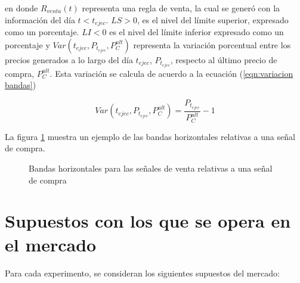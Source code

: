 \documentclass[12pt]{report}
\theoremstyle{break}
\theoremstyle{break}
\begin{document}
en donde $R_{venta}(t)$ representa una regla de venta, la cual se generó con la información del día $t < t_{ejec}$. $LS>0$, es el nivel del límite superior, expresado como un porcentaje. $LI<0$ es el nivel del límite inferior expresado como un porcentaje y $Var(t_{ejec}, P_{t_{ejec}}, P_{C}^{ult} )$ representa la variación porcentual entre los precios generados a lo largo del día $t_{ejec}$, $P_{t_{ejec}}$, respecto al último precio de compra, $P_{C}^{ult}$. Esta variación se calcula de acuerdo a la ecuación (\ref{eqn:variacion bandas})

\begin{equation} \label{eqn:variacion bandas}
Var(t_{ejec}, P_{t_{ejec}}, P_{C}^{ult} ) = \dfrac{P_{t_{ejec}}} {P_{C}^{ult}} - 1
\end{equation}

La figura \ref{imagen:bandas horizontales} muestra un ejemplo de las bandas horizontales relativas a una señal de compra.

\begin{figure}[htbp]
\centering
{}
\caption{\label{imagen:bandas horizontales}Bandas horizontales para las señales de venta relativas a una señal de compra}
\end{figure}

\section{Supuestos con los que se opera en el mercado}
\label{sec:supuestos del mercado}
Para cada experimento, se consideran los siguientes supuestos del mercado:
\end{document}
